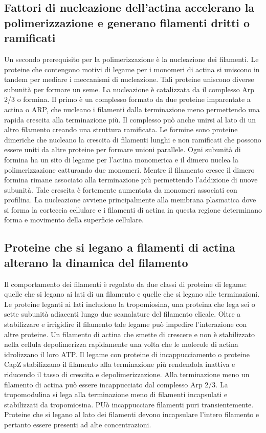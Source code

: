 \subsection{Fattori di nucleazione dell'actina accelerano la polimerizzazione e generano filamenti dritti o ramificati}
Un secondo prerequisito per la polimerizzazione \`e la nucleazione dei filamenti. Le proteine che contengono motivi di legame per i monomeri di actina si uniscono in tandem per
mediare i meccanismi di nucleazione. Tali proteine uniscono diverse subunit\`a per formare un seme. La nucleazione \`e catalizzata da il complesso Arp 2/3 o formina. Il primo \`e un
complesso formato da due proteine imparentate a actina o ARP, che nucleano i filamenti dalla terminazione meno permettendo una rapida crescita alla terminazione pi\`u. Il complesso 
pu\`o anche unirsi al lato di un altro filamento creando una struttura ramificata. Le formine sono proteine dimeriche che nucleano la crescita di filamenti lunghi e non ramificati che 
possono essere uniti da altre proteine per formare unioni parallele. Ogni subunit\`a di formina ha un sito di legame per l'actina monomerica e il dimero nuclea la polimerizzazione 
catturando due monomeri. Mentre il filamento cresce il dimero formina rimane associato alla terminazione pi\`u permettendo l'addizione di nuove subunit\`a. Tale crescita \`e fortemente
aumentata da monomeri associati con profilina. La nucleazione avviene principalmente alla membrana plasmatica dove si forma la corteccia cellulare e i filamenti di actina in questa 
regione determinano forma e movimento della superficie cellulare. 
\subsection{Proteine che si legano a filamenti di actina alterano la dinamica del filamento}
Il comportamento dei filamenti \`e regolato da due classi di proteine di legame: quelle che si legano ai lati di un filamento e quelle che si legano alle terminazioni. Le proteine 
leganti ai lati includono la tropomiosina, una proteina che lega sei o sette subunit\`a adiacenti lungo due scanalature del filamento elicale. Oltre a stabilizzare e irrigidire il 
filamento tale legame pu\`o impedire l'interazione con altre proteine. Un filamento di actina che smette di crescere e non \`e stabilizzato nella cellula depolimerizza rapidamente una
volta che le molecole di actina idrolizzano il loro ATP. Il legame con proteine di incappucciamento o proteine CapZ stabilizzano il filamento alla terminazione pi\`u rendendola inattiva
e riducendo il tasso di crescita e depolimerizzazione. Alla terminazione meno un filamento di actina pu\`o essere incappucciato dal complesso Arp 2/3. La tropomodulina si lega alla
terminazione meno di filamenti incapsulati e stabilizzati da tropomiosina. PU\`o incappucciare filamenti puri transientemente. Proteine che si legano al lato dei filamenti devono 
incapsulare l'intero filamento e pertanto essere presenti ad alte concentrazioni. 
